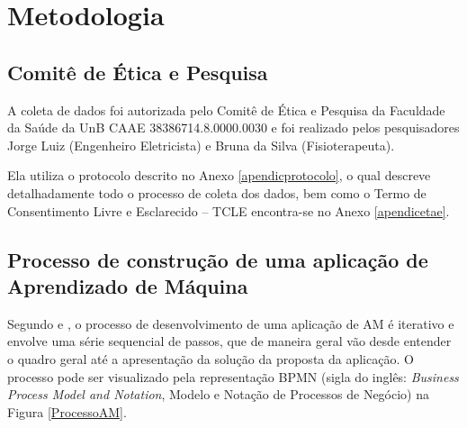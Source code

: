 \chapter{Metodologia}
\section{Comitê de Ética e Pesquisa}
A coleta de dados foi autorizada pelo Comitê de Ética e Pesquisa da Faculdade da Saúde da UnB CAAE 38386714.8.0000.0030 e foi realizado pelos pesquisadores Jorge Luiz (Engenheiro Eletricista) e Bruna da Silva (Fisioterapeuta).

Ela utiliza o protocolo descrito no Anexo \ref{apendicprotocolo}, o qual descreve detalhadamente todo o processo de coleta dos dados, bem como o Termo de Consentimento Livre e Esclarecido – TCLE encontra-se no Anexo \ref{apendicetae}.

\section{Processo de construção de uma aplicação de Aprendizado de Máquina}

Segundo  e , o processo de desenvolvimento de uma aplicação de AM é iterativo e envolve uma série sequencial de passos, que de maneira geral vão desde entender o quadro geral até a apresentação da solução da proposta da aplicação. O processo pode ser visualizado pela representação BPMN (sigla do inglês: \textit{Business Process Model and Notation}, Modelo e Notação de Processos de Negócio) na Figura \ref{ProcessoAM}.


